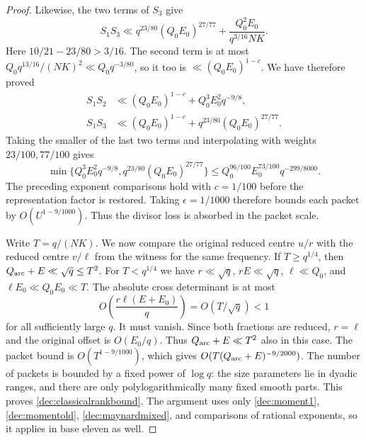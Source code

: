 \documentclass[11pt,a4paper]{article}
\theoremstyle{paperplain}
\numberwithin{equation}{section}
\begin{document}
\begin{proof}
Likewise, the two terms of $S_3$ give
\[
 S_1S_3\ll q^{23/80}(Q_0E_0)^{27/77}
             +\frac{Q_0^2E_0}{q^{3/16}NK}.
\]
Here $10/21-23/80>3/16$.
The second term is at most
$Q_0q^{13/16}/(NK)^2\ll Q_0q^{-3/80}$, so it too is
$\ll(Q_0E_0)^{1-c}$. We have therefore proved
\begin{align*}
 S_1S_2&\ll(Q_0E_0)^{1-c}+Q_0^3E_0^2q^{-9/8},\\
 S_1S_3&\ll(Q_0E_0)^{1-c}+q^{23/80}(Q_0E_0)^{27/77}.
\end{align*}
Taking the smaller of the last two terms and interpolating with weights
$23/100,77/100$ gives
\[
 \min\{Q_0^3E_0^2q^{-9/8}, q^{23/80}(Q_0E_0)^{27/77}\}
 \le Q_0^{96/100}E_0^{73/100}q^{-299/8000}.
\]
The preceding exponent comparisons hold with $c=1/100$ before the
representation factor is restored. Taking $\epsilon=1/1000$
therefore bounds each packet by $O(U^{1-9/1000})$.
Thus the divisor loss is absorbed in the packet scale.

Write $T=q/(NK)$. We now compare the original reduced centre
$u/r$ with the reduced centre $v/\ell$ from the witness for the
same frequency. If $T\ge q^{1/4}$, then
$Q_{\rm arc}+E\ll\sqrt q\le T^2$. For $T<q^{1/4}$ we have
$r\ll\sqrt q$, $rE\ll\sqrt q$, $\ell\ll Q_0$, and
$\ell E_0\ll Q_0E_0\ll T$. The absolute cross determinant is
at most
\[
 O\!\left(\frac{r\ell(E+E_0)}q\right)
 =O(T/\sqrt q)<1
\]
for all sufficiently large $q$. It must vanish. Since both fractions
are reduced, $r=\ell$ and the original offset is $O(E_0/q)$.
Thus $Q_{\rm arc}+E\ll T^2$ also in this case.
The packet bound is $O(T^{1-9/1000})$, which gives
$O(T(Q_{\rm arc}+E)^{-9/2000})$. The number of packets is bounded
by a fixed power of $\log q$: the size parameters lie in dyadic
ranges, and there are only polylogarithmically many fixed smooth
parts. This proves \eqref{dec:classicalrankbound}. The argument uses only
\eqref{dec:moment1}, \eqref{dec:momentold}, \eqref{dec:maynardmixed},
and comparisons of rational exponents, so it applies in base eleven
as well.
\end{proof}
\end{document}
